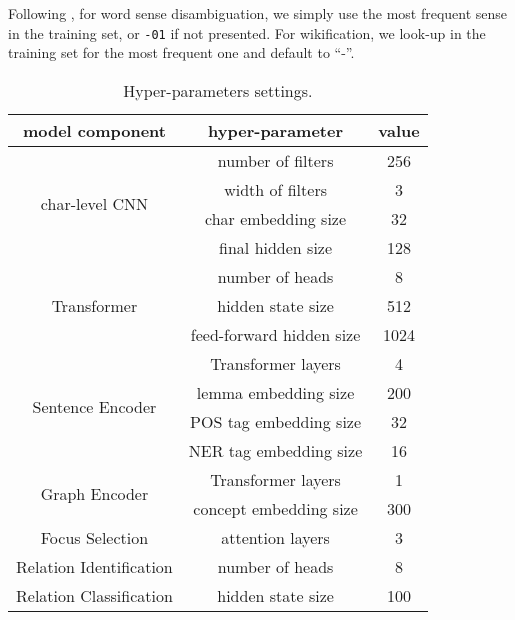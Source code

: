 \documentclass[11pt,a4paper]{article}
\begin{document}
Following , for word sense disambiguation, we simply use the most frequent sense in the training set, or \texttt{-01} if not presented. For wikification, we look-up in the training set for the most frequent one and default to ``-”.
	\begin{table}[t]
	\centering
	\small
	\begin{tabular}{c|c|c}
		\hline
		model component&  hyper-parameter& value\\
		\hline
		\multirow{4}{*}{char-level CNN} & number of filters & 256 \\
		& width of filters & 3 \\
		& char embedding size & 32 \\
		& final hidden size & 128 \\
		\hline
		\multirow{3}{*}{Transformer} & number of heads & 8 \\
		& hidden state size & 512 \\
		& feed-forward hidden size  & 1024 \\
		\hline
		\multirow{4}{*}{Sentence Encoder} &Transformer layers& 4\\
		&lemma embedding size& 200\\
		& POS tag embedding size & 32 \\
		& NER tag embedding size & 16 \\
		\hline
		\multirow{2}{*}{Graph Encoder} & Transformer layers & 1 \\
		&concept embedding size&300\\
		\hline
		Focus Selection & attention layers & 3 \\
		\hline
		Relation Identification & number of heads & 8 \\
		\hline
		Relation Classification & hidden state size & 100 \\
		\hline
	\end{tabular}
	\caption{Hyper-parameters settings. }
	\label{setting}
\end{table}
\end{document}

